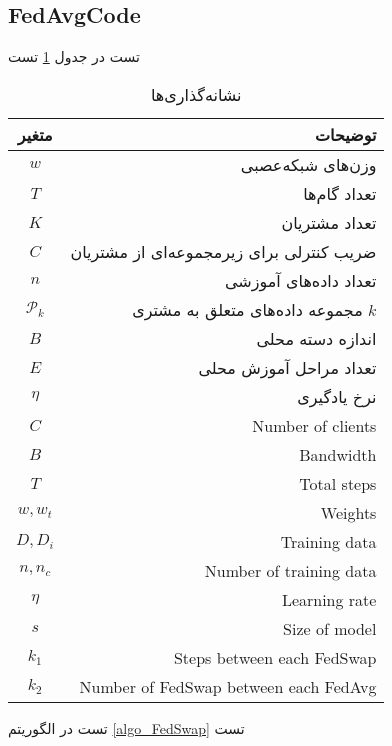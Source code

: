 \subsection{FedAvgCode}
تست در جدول
\ref{tabel_notation}
تست


\begin{table}[h]
\centering
	\caption{نشانه‌گذاری‌ها}
	\label{tabel_notation}
	\begin{tabular}{cr}
		\hline
		متغیر & توضیحات \\
		\hline
		$w$ & وزن‌های شبکه‌عصبی \\
		$T$ & تعداد گام‌ها \\
		$K$ & تعداد مشتریان \\
		$C$ & ضریب کنترلی برای زیرمجموعه‌ای از مشتریان \\
		$n$ & تعداد داده‌های آموزشی \\
		$\mathcal{P}_k$ & مجموعه داده‌های متعلق به مشتری $k$ \\
		$B$ & اندازه دسته محلی \\
		$E$ & تعداد مراحل آموزش محلی \\
		$\eta$ & نرخ یادگیری \\
		
		$C$ & Number of clients \\
		$B$ & Bandwidth \\
		$T$ & Total steps \\
		$w, w_t$ & Weights \\
		$D, D_i$ & Training data \\
		$n, n_c$ & Number of training data \\
		$\eta$ & Learning rate \\
		$s$ & Size of model \\
		$k_1$ & Steps between each FedSwap \\
		$k_2$ & Number of FedSwap between each FedAvg \\
		\hline
	\end{tabular}
\end{table}




تست در الگوریتم
\ref{algo_FedSwap}
تست


